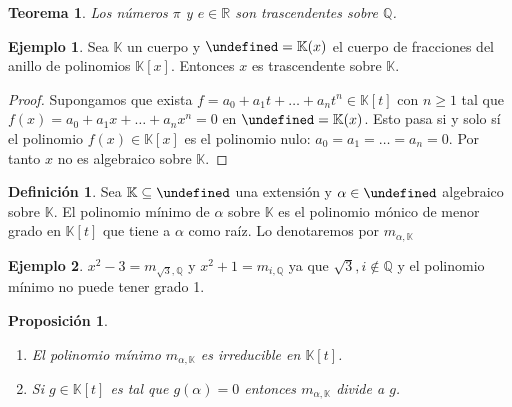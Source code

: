 \documentclass[10pt, spanish]{report}
\newtheorem*{prop}{Proposición}
\newtheorem*{tma}{Teorema}
\theoremstyle{definition}
\newtheorem*{defin}{Definición}
\newtheorem*{ej}{Ejemplo}
\newcommand{\Q}{\mathbb{Q}}
\newcommand{\R}{\mathbb{R}}
\newcommand{\K}{\mathbb{K}}
\let\L\undefined
\newcommand{\L}{\mathbb{L}}
\renewcommand{\geq}{\geqslant}
\begin{document}
\begin{tma}
    Los números $\pi$ y $e\in\R$ son trascendentes sobre $\Q$.
\end{tma}

\begin{ej}
    Sea $\K$ un cuerpo y $\L=\K(x)$ el cuerpo de fracciones del anillo de
    polinomios $\K[x]$. Entonces $x$ es trascendente sobre $\K$.
\end{ej}

\begin{proof}
    Supongamos que exista $f=a_0+a_1t+\ldots+a_nt^n\in\K[t]$ con $n\geq1$ tal
    que $f(x)=a_0+a_1x+\ldots+a_nx^n=0$ en $\L=\K(x)$. Esto pasa si y solo sí el
    polinomio $f(x)\in\K[x]$ es el polinomio nulo: $a_0=a_1=\ldots=a_n=0$. Por
    tanto $x$ no es algebraico sobre $\K$.
\end{proof}

\begin{defin}
    Sea $\K\subseteq\L$ una extensión y $\alpha\in\L$ algebraico sobre $\K$. El
    polinomio mínimo de $\alpha$ sobre $\K$ es el polinomio mónico de menor
    grado en $\K[t]$ que tiene a $\alpha$ como raíz. Lo denotaremos por
    $m_{\alpha,\K}$
\end{defin}

\begin{ej}
    $x^2-3=m_{\sqrt{3},\Q}$ y $x^2+1=m_{i,\Q}$ ya que $\sqrt{3},i\not\in\Q$ y el
    polinomio mínimo no puede tener grado 1.
\end{ej}

\begin{prop}\hspace{0pt}
    \begin{enumerate}
        \item El polinomio mínimo $m_{\alpha,\K}$ es irreducible en $\K[t]$.
        \item Si $g\in \K[t]$ es tal que $g(\alpha)=0$ entonces $m_{\alpha,\K}$
            divide a $g$.
    \end{enumerate}
\end{prop}
\end{document}

